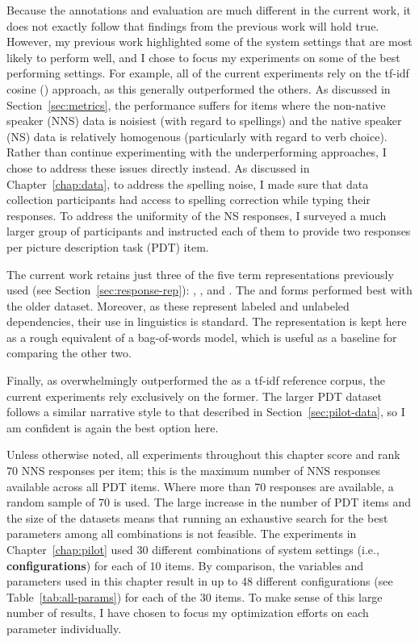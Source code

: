Because the annotations and evaluation are much different in the current work, it does not exactly follow that findings from the previous work will hold true. However, my previous work highlighted some of the system settings that are most likely to perform well, and I chose to focus my experiments on some of the best performing settings. For example, all of the current experiments rely on the tf-idf cosine () approach, as this generally outperformed the others. As discussed in Section~\ref{sec:metrics}, the  performance suffers for items where the non-native speaker (NNS) data is noisiest (with regard to spellings) and the native speaker (NS) data is relatively homogenous (particularly with regard to verb choice). Rather than continue experimenting with the underperforming approaches, I chose to address these issues directly instead. As discussed in Chapter~\ref{chap:data}, to address the spelling noise, I made sure that data collection participants had access to spelling correction while typing their responses. To address the uniformity of the NS responses, I surveyed a much larger group of participants and instructed each of them to provide two responses per picture description task (PDT) item.

The current work retains just three of the five term representations previously used (see Section~\ref{sec:response-rep}): , , and . The  and  forms performed best with the older dataset. Moreover, as these represent labeled and unlabeled dependencies, their use in linguistics is standard. The  representation is kept here as a rough equivalent of a bag-of-words model, which is useful as a baseline for comparing the other two.

Finally, as  overwhelmingly outperformed the  as a tf-idf reference corpus, the current experiments rely exclusively on the former. The larger PDT dataset follows a similar narrative style to that described in Section~\ref{sec:pilot-data}, so I am confident  is again the best option here.

Unless otherwise noted, all experiments throughout this chapter score and rank 70 NNS responses per item; this is the maximum number of NNS responses available across all PDT items. Where more than 70 responses are available, a random sample of 70 is used. The large increase in the number of PDT items and the size of the datasets means that running an exhaustive search for the best parameters among all combinations is not feasible. The experiments in Chapter~\ref{chap:pilot} used 30 different combinations of system settings (i.e., \textbf{configurations}) for each of 10 items. By comparison, the variables and parameters used in this chapter result in up to 48 different configurations (see Table~\ref{tab:all-params}) for each of the 30 items. To make sense of this large number of results, I have chosen to focus my optimization efforts on each parameter individually.


